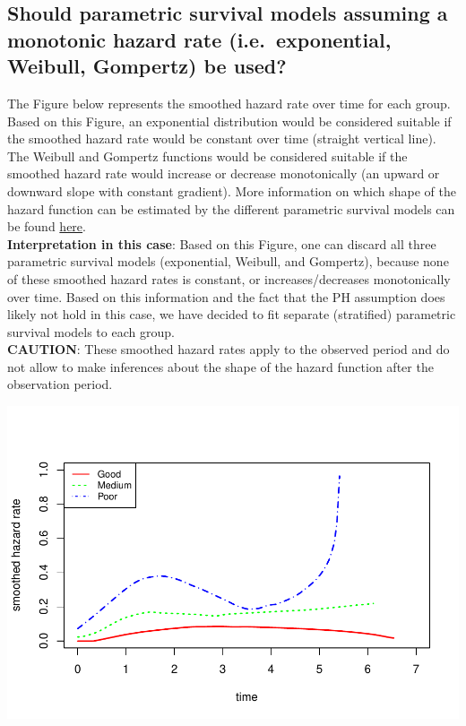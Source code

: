 \documentclass[
]{article}
\begin{document}
\hypertarget{should-parametric-survival-models-assuming-a-monotonic-hazard-rate-i.e.-exponential-weibull-gompertz-be-used}{%
\subsection{Should parametric survival models assuming a monotonic
hazard rate (i.e.~exponential, Weibull, Gompertz) be
used?}\label{should-parametric-survival-models-assuming-a-monotonic-hazard-rate-i.e.-exponential-weibull-gompertz-be-used}}

The Figure below represents the smoothed hazard rate over time for each
group. Based on this Figure, an exponential distribution would be
considered suitable if the smoothed hazard rate would be constant over
time (straight vertical line). The Weibull and Gompertz functions would
be considered suitable if the smoothed hazard rate would increase or
decrease monotonically (an upward or downward slope with constant
gradient). More information on which shape of the hazard function can be
estimated by the different parametric survival models can be found
\href{https://devinincerti.com/2019/06/18/parametric_survival.html}{here}.\\
\textbf{Interpretation in this case}: Based on this Figure, one can
discard all three parametric survival models (exponential, Weibull, and
Gompertz), because none of these smoothed hazard rates is constant, or
increases/decreases monotonically over time. Based on this information
and the fact that the PH assumption does likely not hold in this case,
we have decided to fit separate (stratified) parametric survival models
to each group.\\
\textbf{CAUTION}: These smoothed hazard rates apply to the observed
period and do not allow to make inferences about the shape of the hazard
function after the observation period.

\begin{flushleft}\includegraphics{Images/plot_hr-1} \end{flushleft}
\end{document}

